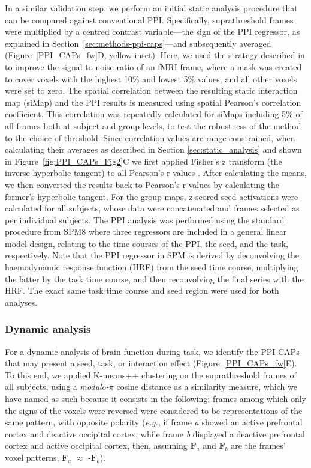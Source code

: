 In a similar validation step, we perform an initial static analysis procedure that can be compared against conventional PPI. Specifically, suprathreshold frames were multiplied by a centred contrast variable---the sign of the PPI regressor, as explained in Section~\ref{sec:methods-ppi-caps}---and subsequently averaged (Figure~\ref{PPI_CAPs_fw}D, yellow inset). Here, we used the strategy described in \citet{Liu2013} to improve the signal-to-noise ratio of an fMRI frame, where a mask was created to cover voxels with the highest 10\% and lowest 5\% values, and all other voxels were set to zero. The spatial correlation between the resulting static interaction map (siMap) and the PPI results is measured using spatial Pearson’s correlation coefficient. This correlation was repeatedly calculated for siMaps including 5\% of all frames both at subject and group levels, to test the robustness of the method to the choice of threshold. Since correlation values are range-constrained, when calculating their averages as described in Section \ref{sec:static_analysis} and shown in Figure~\ref{fig:PPI_CAPs_Fig2}C we first applied Fisher's z transform (the inverse hyperbolic tangent) to all Pearson's r values \citep{Cox2008}. After calculating the means, we then converted the results back to Pearson's r values by calculating the former's hyperbolic tangent. For the group maps, z-scored seed activations were calculated for all subjects, whose data were concatenated and frames selected as per individual subjects.    The PPI analysis was performed using the standard procedure from  SPM8 where three regressors are included in a general linear model design, relating to the time courses of the PPI, the seed, and the task, respectively. Note that the PPI regressor in SPM is derived by deconvolving the haemodynamic response function (HRF) from the seed time course, multiplying the latter by the task time course, and then reconvolving the final series with the HRF. The exact same task time course and seed region were used for both analyses.

\subsubsection{Dynamic analysis} \label{sectionKmeans}
For a dynamic analysis of brain function during task, we identify the PPI-CAPs that may present a seed, task, or interaction effect (Figure~\ref{PPI_CAPs_fw}E). To this end, we applied  K-means++ clustering on the suprathreshold frames of all subjects, using a \textit{modulo-$\pi$} cosine distance as a similarity measure, which we have named as such because it consists in the following: frames among which only the signs of the voxels were reversed were considered to be representations of the same pattern, with opposite polarity (\textit{e.g.}, if frame \textit{a} showed an active prefrontal cortex and deactive occipital cortex, while frame \textit{b} displayed a deactive prefrontal cortex and active occipital cortex, then, assuming {$\mathbf{F}_a$} and {$\mathbf{F}_b$} are the frames' voxel patterns, {$\mathbf{F}_a$} $\approx$ -{$\mathbf{F}_b$}). 

